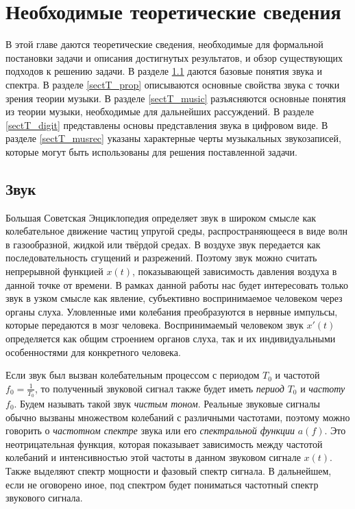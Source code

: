 \chapter{Необходимые теоретические сведения} \label{chaptT}

В этой главе даются теоретические сведения, необходимые для формальной
постановки задачи и описания достигнутых результатов, и обзор существующих
подходов к решению задачи. В разделе \ref{sectT_sound} даются базовые понятия
звука и спектра. В разделе \ref{sectT_prop} описываются основные свойства звука
с точки зрения теории музыки. В разделе \ref{sectT_music} разъясняются основные
понятия из теории музыки, необходимые для дальнейших рассуждений. В разделе
\ref{sectT_digit} представлены основы представления звука в цифровом виде.
В разделе \ref{sectT_musrec} указаны характерные черты музыкальных звукозаписей,
которые могут быть использованы для решения поставленной задачи.


\section{Звук} \label{sectT_sound}

Большая Советская Энциклопедия \cite{Bse1972} определяет звук в широком смысле
как колебательное движение частиц упругой среды, распространяющееся в виде волн в
газообразной, жидкой или твёрдой средах. В воздухе звук передается как
последовательность сгущений и разрежений. Поэтому звук можно считать непрерывной
функцией $x(t)$, показывающей зависимость давления воздуха в данной точке от
времени. В рамках данной работы нас будет интересовать только звук в узком
смысле как явление, субъективно воспринимаемое человеком через органы слуха.
Уловленные ими колебания преобразуются в нервные импульсы, которые передаются в
мозг человека. Воспринимаемый человеком звук $x'(t)$ определяется как общим
строением органов слуха, так и их индивидуальными особенностями для конкретного
человека.

Если звук был вызван колебательным процессом с периодом $T_0$ и частотой $f_0 =
\frac{1}{T_0}$, то полученный звуковой сигнал также будет иметь \emph{период}
$T_0$ и \emph{частоту} $f_0$. Будем называть такой звук \emph{чистым тоном}.
Реальные звуковые сигналы обычно вызваны множеством колебаний с различными
частотами, поэтому можно говорить о \emph{частотном спектре} звука или его
\emph{спектральной функции} $a(f)$. Это неотрицательная функция,
которая показывает зависимость между частотой колебаний и интенсивностью этой
частоты в данном звуковом сигнале $x(t)$. Также выделяют спектр мощности и
фазовый спектр сигнала. В дальнейшем, если не оговорено иное, под спектром будет
пониматься частотный спектр звукового сигнала.

